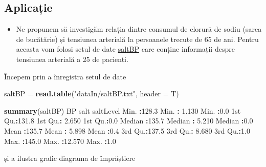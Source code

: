 \documentclass[]{article}
\newenvironment{Shaded}{\begin{snugshade}}{\end{snugshade}}
\newcommand{\KeywordTok}[1]{\textcolor[rgb]{0.13,0.29,0.53}{\textbf{#1}}}
\newcommand{\DataTypeTok}[1]{\textcolor[rgb]{0.13,0.29,0.53}{#1}}
\newcommand{\DecValTok}[1]{\textcolor[rgb]{0.00,0.00,0.81}{#1}}
\newcommand{\FloatTok}[1]{\textcolor[rgb]{0.00,0.00,0.81}{#1}}
\newcommand{\StringTok}[1]{\textcolor[rgb]{0.31,0.60,0.02}{#1}}
\newcommand{\OperatorTok}[1]{\textcolor[rgb]{0.81,0.36,0.00}{\textbf{#1}}}
\newcommand{\NormalTok}[1]{#1}
\newenvironment{frshaded*}{%
  \def\FrameCommand{\fboxrule=\FrameRule\fboxsep=\FrameSep \fcolorbox{framecolor}{shadecolor1}}%
  \MakeFramed {\advance\hsize-\width \FrameRestore}}%
{\endMakeFramed}
\newenvironment{rmdblock}[1]
  {\begin{frshaded*}
  \begin{itemize}
  \renewcommand{\labelitemi}{
    \raisebox{-.7\height}[0pt][0pt]{
      {\setkeys{Gin}{width=2em,keepaspectratio}\texttt{[image: images/icons/\#1]}}
    }
  }
  \item
  }
  {
  \end{itemize}
  \end{frshaded*}
  }
\newenvironment{rmdexercise}
  {\begin{rmdblock}{exercise}}
  {\end{rmdblock}}
\begin{document}
\subsection{Aplicație}\label{aplicatie}

\begin{rmdexercise}
Ne propunem să investigăm relația dintre consumul de clorură de sodiu
(sarea de bucătărie) și tensiunea arterială la persoanele trecute de 65
de ani. Pentru aceasta vom folosi setul de date
\href{dataIn/saltBP.txt}{saltBP} care conține informații despre
tensiunea arterială a 25 de pacienți.
\end{rmdexercise}

Începem prin a înregistra setul de date

\begin{Shaded}
\begin{Highlighting}[]
\NormalTok{saltBP =}\StringTok{ }\KeywordTok{read.table}\NormalTok{(}\StringTok{"dataIn/saltBP.txt"}\NormalTok{, }\DataTypeTok{header =}\NormalTok{ T)}

\KeywordTok{summary}\NormalTok{(saltBP)}
\NormalTok{       BP             salt          saltLevel  }
\NormalTok{ Min.   }\OperatorTok{:}\FloatTok{128.3}\NormalTok{   Min.   }\OperatorTok{:}\StringTok{ }\FloatTok{1.130}\NormalTok{   Min.   }\OperatorTok{:}\FloatTok{0.0}  
\NormalTok{ 1st Qu.}\OperatorTok{:}\FloatTok{131.8}\NormalTok{   1st Qu.}\OperatorTok{:}\StringTok{ }\FloatTok{2.650}\NormalTok{   1st Qu.}\OperatorTok{:}\FloatTok{0.0}  
\NormalTok{ Median }\OperatorTok{:}\FloatTok{135.7}\NormalTok{   Median }\OperatorTok{:}\StringTok{ }\FloatTok{5.210}\NormalTok{   Median }\OperatorTok{:}\FloatTok{0.0}  
\NormalTok{ Mean   }\OperatorTok{:}\FloatTok{135.7}\NormalTok{   Mean   }\OperatorTok{:}\StringTok{ }\FloatTok{5.898}\NormalTok{   Mean   }\OperatorTok{:}\FloatTok{0.4}  
\NormalTok{ 3rd Qu.}\OperatorTok{:}\FloatTok{137.5}\NormalTok{   3rd Qu.}\OperatorTok{:}\StringTok{ }\FloatTok{8.680}\NormalTok{   3rd Qu.}\OperatorTok{:}\FloatTok{1.0}  
\NormalTok{ Max.   }\OperatorTok{:}\FloatTok{145.0}\NormalTok{   Max.   }\OperatorTok{:}\FloatTok{12.570}\NormalTok{   Max.   }\OperatorTok{:}\FloatTok{1.0}  
\end{Highlighting}
\end{Shaded}

și a ilustra grafic diagrama de împrăștiere

\begin{Shaded}
\end{Shaded}
\end{document}
